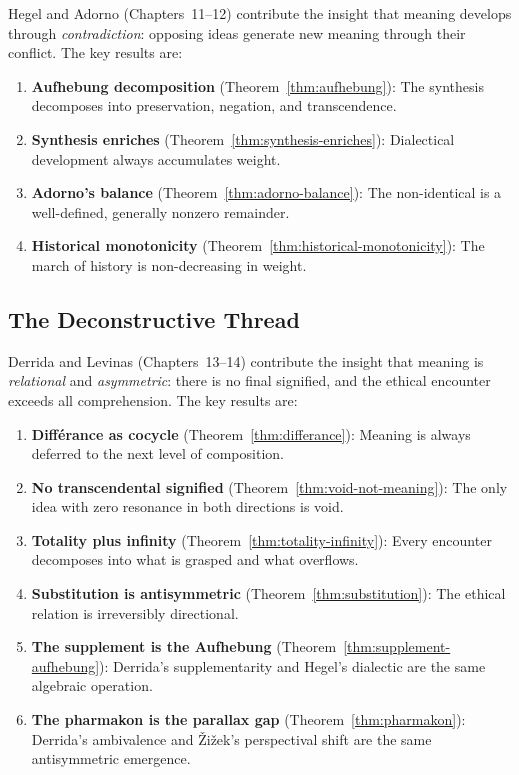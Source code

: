 Hegel and Adorno (Chapters~11--12) contribute the insight that meaning develops
through \emph{contradiction}: opposing ideas generate new meaning through their
conflict. The key results are:
\begin{enumerate}
\item \textbf{Aufhebung decomposition} (Theorem~\ref{thm:aufhebung}): The
synthesis decomposes into preservation, negation, and transcendence.
\item \textbf{Synthesis enriches} (Theorem~\ref{thm:synthesis-enriches}):
Dialectical development always accumulates weight.
\item \textbf{Adorno's balance} (Theorem~\ref{thm:adorno-balance}): The
non-identical is a well-defined, generally nonzero remainder.
\item \textbf{Historical monotonicity} (Theorem~\ref{thm:historical-monotonicity}):
The march of history is non-decreasing in weight.
\end{enumerate}

\subsection{The Deconstructive Thread}

Derrida and Levinas (Chapters~13--14) contribute the insight that meaning is
\emph{relational} and \emph{asymmetric}: there is no final signified, and the
ethical encounter exceeds all comprehension. The key results are:
\begin{enumerate}
\item \textbf{Diff\'erance as cocycle} (Theorem~\ref{thm:differance}): Meaning
is always deferred to the next level of composition.
\item \textbf{No transcendental signified} (Theorem~\ref{thm:void-not-meaning}):
The only idea with zero resonance in both directions is void.
\item \textbf{Totality plus infinity} (Theorem~\ref{thm:totality-infinity}):
Every encounter decomposes into what is grasped and what overflows.
\item \textbf{Substitution is antisymmetric} (Theorem~\ref{thm:substitution}):
The ethical relation is irreversibly directional.
\item \textbf{The supplement is the Aufhebung}
(Theorem~\ref{thm:supplement-aufhebung}): Derrida's supplementarity and
Hegel's dialectic are the same algebraic operation.
\item \textbf{The pharmakon is the parallax gap}
(Theorem~\ref{thm:pharmakon}): Derrida's ambivalence and \v{Z}i\v{z}ek's
perspectival shift are the same antisymmetric emergence.
\end{enumerate}


